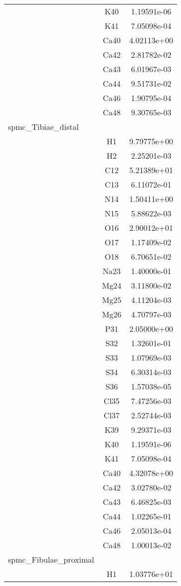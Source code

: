 \begin{centering}
\begin{longtable}{l c c}
& K40 & 1.19591e-06 \\ 
& K41 & 7.05098e-04 \\ 
& Ca40 & 4.02113e+00 \\ 
& Ca42 & 2.81782e-02 \\ 
& Ca43 & 6.01967e-03 \\ 
& Ca44 & 9.51731e-02 \\ 
& Ca46 & 1.90795e-04 \\ 
& Ca48 & 9.30765e-03 \\ 
\hline
spmc\_Tibiae\_distal & & \\
\hline
& H1 & 9.79775e+00 \\ 
& H2 & 2.25201e-03 \\ 
& C12 & 5.21389e+01 \\ 
& C13 & 6.11072e-01 \\ 
& N14 & 1.50411e+00 \\ 
& N15 & 5.88622e-03 \\ 
& O16 & 2.90012e+01 \\ 
& O17 & 1.17409e-02 \\ 
& O18 & 6.70651e-02 \\ 
& Na23 & 1.40000e-01 \\ 
& Mg24 & 3.11800e-02 \\ 
& Mg25 & 4.11204e-03 \\ 
& Mg26 & 4.70797e-03 \\ 
& P31 & 2.05000e+00 \\ 
& S32 & 1.32601e-01 \\ 
& S33 & 1.07969e-03 \\ 
& S34 & 6.30314e-03 \\ 
& S36 & 1.57038e-05 \\ 
& Cl35 & 7.47256e-03 \\ 
& Cl37 & 2.52744e-03 \\ 
& K39 & 9.29371e-03 \\ 
& K40 & 1.19591e-06 \\ 
& K41 & 7.05098e-04 \\ 
& Ca40 & 4.32078e+00 \\ 
& Ca42 & 3.02780e-02 \\ 
& Ca43 & 6.46825e-03 \\ 
& Ca44 & 1.02265e-01 \\ 
& Ca46 & 2.05013e-04 \\ 
& Ca48 & 1.00013e-02 \\ 
\hline
spmc\_Fibulae\_proximal & & \\
\hline
& H1 & 1.03776e+01 \\ 

\end{longtable}
\end{centering}
